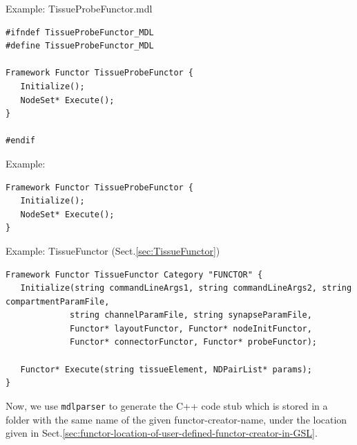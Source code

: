Example: TissueProbeFunctor.mdl
\begin{verbatim}
#ifndef TissueProbeFunctor_MDL                                                                                                                                                                      
#define TissueProbeFunctor_MDL                                                                                
                                                                                                              
Framework Functor TissueProbeFunctor {                                                                        
   Initialize();                                                                                              
   NodeSet* Execute();                                                                                        
}                                                                                                             
                                                                                                              
#endif
\end{verbatim}

Example:
\begin{verbatim}
Framework Functor TissueProbeFunctor {
   Initialize();
   NodeSet* Execute();
}
\end{verbatim}

Example: TissueFunctor (Sect.\ref{sec:TissueFunctor})
{\tiny
\begin{verbatim}
Framework Functor TissueFunctor Category "FUNCTOR" {
   Initialize(string commandLineArgs1, string commandLineArgs2, string compartmentParamFile, 
             string channelParamFile, string synapseParamFile, 
             Functor* layoutFunctor, Functor* nodeInitFunctor, 
             Functor* connectorFunctor, Functor* probeFunctor); 
       
   Functor* Execute(string tissueElement, NDPairList* params);
}
\end{verbatim}
}

Now, we use \verb!mdlparser! to generate the C++ code stub which is stored in a
folder with the same name of the given functor-creator-name, under the location
given in Sect.\ref{sec:functor-location-of-user-defined-functor-creator-in-GSL}.




